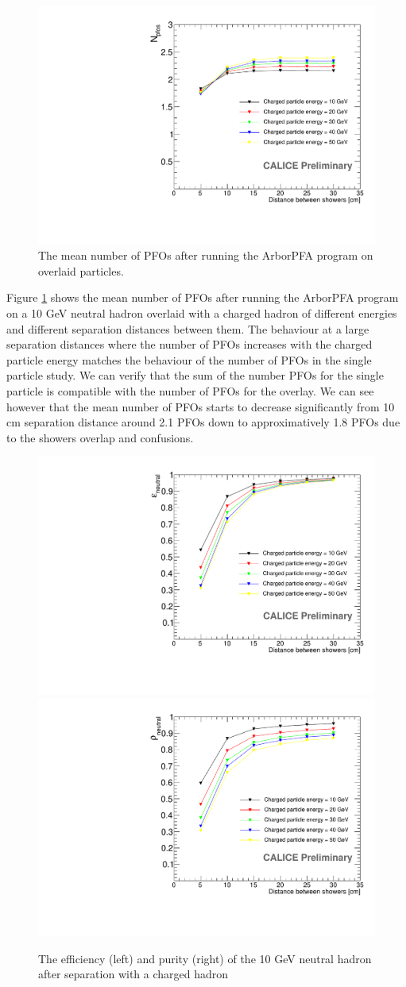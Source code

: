 \documentclass[cits]{JINST}
\begin{document}
\begin{figure}[!h]
  \begin{center}
    \includegraphics[width=0.6\linewidth]{plots/OverlayEvent_NPfos.pdf}
  \end{center}
  \caption{\label{OVERLAY_EVENT_NPFOS} The mean number of PFOs after running the ArborPFA program on overlaid particles.}
\end{figure}


Figure \ref{OVERLAY_EVENT_NPFOS} shows the mean number of PFOs after running the ArborPFA program on a 10 GeV neutral hadron overlaid with a charged hadron of different energies and different separation distances between them. The behaviour at a large separation distances where the number of PFOs increases with the charged particle energy matches the behaviour of the number of PFOs in the single particle study. We can verify that the sum of the number PFOs for the single particle is compatible with the number of PFOs for the overlay. We can see however that the mean number of PFOs starts to decrease significantly from 10 cm separation distance around 2.1 PFOs down to approximatively 1.8 PFOs due to the showers overlap and confusions.

\begin{figure}[!h]
  \begin{center}
    \includegraphics[width=0.47\linewidth]{plots/OverlayEvent_NeutralEfficiency.pdf}
    \includegraphics[width=0.47\linewidth]{plots/OverlayEvent_NeutralPurity.pdf}
  \end{center}
  \caption{\label{OVERLAY_EVENT_PURITY_EFFICIENCY} The efficiency (left) and purity (right) of the 10 GeV neutral hadron after separation with a charged hadron}
\end{figure}
\end{document}
